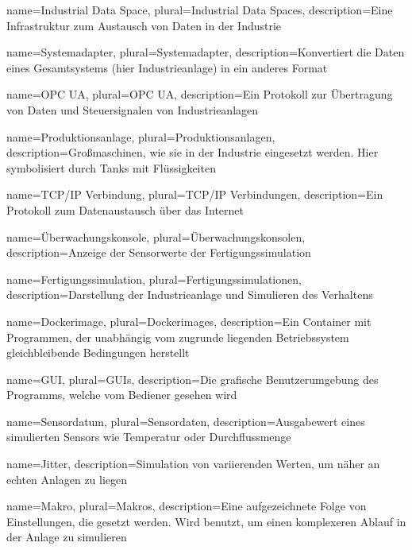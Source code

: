 
{
  name=Industrial Data Space,
  plural=Industrial Data Spaces,
  description={Eine Infrastruktur zum Austausch von Daten in der Industrie}
}

{
  name=Systemadapter,
  plural=Systemadapter,
  description={Konvertiert die Daten eines Gesamtsystems (hier Industrieanlage) in ein anderes Format}
}

{
  name=OPC UA,
  plural=OPC UA,
  description={Ein Protokoll zur Übertragung von Daten und Steuersignalen von Industrieanlagen}
}

{
  name=Produktionsanlage,
  plural=Produktionsanlagen,
  description={Großmaschinen, wie sie in der Industrie eingesetzt werden. Hier symbolisiert durch Tanks mit Flüssigkeiten}
}

{
  name=TCP/IP Verbindung,
  plural=TCP/IP Verbindungen,
  description={Ein Protokoll zum Datenaustausch über das Internet}
}

{
  name=Überwachungskonsole,
  plural=Überwachungskonsolen,
  description={Anzeige der Sensorwerte der Fertigungssimulation}
}

{
  name=Fertigungssimulation,
  plural=Fertigungssimulationen,
  description={Darstellung der Industrieanlage und Simulieren des Verhaltens}
}

{
  name=Dockerimage,
  plural=Dockerimages,
  description={Ein Container mit Programmen, der unabhängig vom zugrunde liegenden Betriebssystem gleichbleibende Bedingungen herstellt}
}

{
  name=GUI,
  plural=GUIs,
  description={Die grafische Benutzerumgebung des Programms, welche vom Bediener gesehen wird}
}

{
  name=Sensordatum,
  plural=Sensordaten,
  description={Ausgabewert eines simulierten Sensors wie Temperatur oder Durchflussmenge}
}

{
  name=Jitter,
  description={Simulation von variierenden Werten, um näher an echten Anlagen zu liegen}
}

{
  name=Makro,
  plural=Makros,
  description={Eine aufgezeichnete Folge von Einstellungen, die gesetzt werden. Wird benutzt, um einen komplexeren Ablauf in der Anlage zu simulieren}
}
